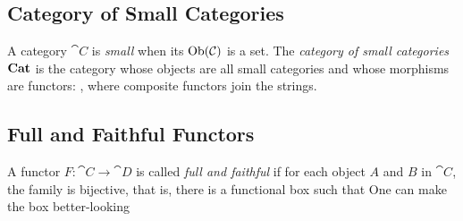 \subsection{Category of Small Categories}

A category $\cat{C}$ is \emph{small} when its $\operatorname{Ob}(\mathcal{C})$ is a set. %
The \emph{category of small categories} $\boldsymbol{\mathrm{Cat}}$ is the category whose objects are %
all small categories and whose morphisms are functors:
, where composite functors join the strings.


\subsection{Full and Faithful Functors}

A functor $F : \cat{C} \to \cat{D}$ is called \emph{full and faithful} %
if for each object $A$ and $B$ in $\cat{C}$, the family 
is bijective, that is, there is a functional box such that
One can make the box better-looking


